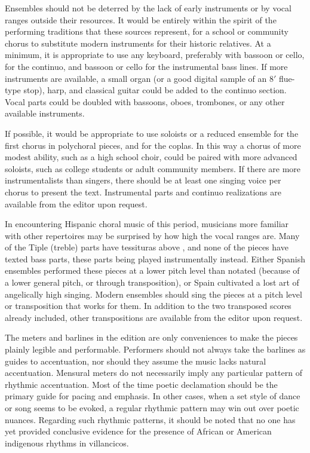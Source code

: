 Ensembles should not be deterred by the lack of early instruments or by vocal
ranges outside their resources.
It would be entirely within the spirit of the performing traditions that these
sources represent, for a school or community chorus to substitute modern
instruments for their historic relatives.
At a minimum, it is appropriate to use any keyboard, preferably with bassoon or
cello, for the continuo, and bassoon or cello for the instrumental bass lines.
If more instruments are available, a small organ (or a good digital sample of an 
8$'$ flue-type stop), harp, and classical guitar could be added to the continuo
section.  
Vocal parts could be doubled with bassoons, oboes, trombones, or any other
available instruments.

If possible, it would be appropriate to use soloists or a reduced ensemble for
the first chorus in polychoral pieces, and for the coplas.
In this way a chorus of more modest ability, such as a high school choir, could
be paired with more advanced soloists, such as college students or adult
community members.
If there are more instrumentalists than singers, there should be at least one
singing voice per chorus to present the text.
Instrumental parts and continuo realizations are available from the editor upon
request.

In encountering Hispanic choral music of this period, musicians more familiar
with other repertoires may be surprised by how high the vocal ranges are.
Many of the Tiple (treble) parts have tessituras above , and none of
the pieces have texted bass parts, these parts being played instrumentally
instead.
Either Spanish ensembles performed these pieces at a lower pitch level than
notated (because of a lower general pitch, or through transposition), or Spain
cultivated a lost art of angelically high singing.%
\Autocite[157]{Kendrick:Jeremiah}
Modern ensembles should sing the pieces at a pitch level or transposition that
works for them.
In addition to the two transposed scores already included, other transpositions  
are available from the editor upon request.

The meters and barlines in the edition are only conveniences to make the pieces
plainly legible and performable.
Performers should not always take the barlines as guides to accentuation, nor
should they assume the music lacks natural accentuation.
Mensural meters do not necessarily imply any particular pattern of rhythmic 
accentuation.
Most of the time poetic declamation should be the primary guide for pacing
and emphasis.
In other cases, when a set style of dance or song seems to be evoked, a regular
rhythmic pattern may win out over poetic nuances.
Regarding such rhythmic patterns, it should be noted that no one has yet
provided conclusive evidence for the presence of African or American indigenous
rhythms in villancicos.

